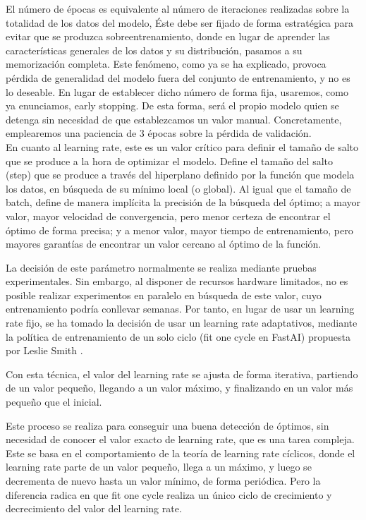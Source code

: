 El número de épocas es equivalente al número de iteraciones realizadas sobre la totalidad de los datos del modelo, Éste debe ser fijado de forma estratégica para evitar que se produzca sobreentrenamiento, donde en lugar de aprender las características generales de los datos y su distribución, pasamos a su memorización completa. Este fenómeno, como ya se ha explicado, provoca pérdida de generalidad del modelo fuera del conjunto de entrenamiento, y no es lo deseable. En lugar de establecer dicho número de forma fija, usaremos, como ya enunciamos, early stopping. De esta forma, será el propio modelo quien se detenga sin necesidad de que establezcamos un valor manual. Concretamente, emplearemos una paciencia de 3 épocas sobre la pérdida de validación.\\

En cuanto al learning rate, este es un valor crítico para definir el tamaño de salto que se produce a la hora de optimizar el modelo. Define el tamaño del salto (step) que se produce a través del hiperplano definido por la función que modela los datos, en búsqueda de su mínimo local (o global). Al igual que el tamaño de batch, define de manera implícita la precisión de la búsqueda del óptimo; a mayor valor, mayor velocidad de convergencia, pero menor certeza de encontrar el óptimo de forma precisa; y a menor valor, mayor tiempo de entrenamiento, pero mayores garantías de encontrar un valor cercano al óptimo de la función.

La decisión de este parámetro normalmente se realiza mediante pruebas experimentales. Sin embargo, al disponer de recursos hardware limitados, no es posible realizar experimentos en paralelo en búsqueda de este valor, cuyo entrenamiento podría conllevar semanas. Por tanto, en lugar de usar un learning rate fijo, se ha tomado la decisión de usar un learning rate adaptativos, mediante la política de entrenamiento de un solo ciclo (fit one cycle en FastAI) propuesta por Leslie Smith \cite{smith2018disciplined}.

Con esta técnica, el valor del learning rate se ajusta de forma iterativa, partiendo de un valor pequeño, llegando a un valor máximo, y finalizando en un valor más pequeño que el inicial.

Este proceso se realiza para conseguir una buena detección de óptimos, sin necesidad de conocer el valor exacto de learning rate, que es una tarea compleja. Este se basa en el comportamiento de la teoría de learning rate cíclicos, donde el learning rate parte de un valor pequeño, llega a un máximo, y luego se decrementa de nuevo hasta un valor mínimo, de forma periódica. Pero la diferencia radica en que fit one cycle realiza un único ciclo de crecimiento y decrecimiento del valor del learning rate.

